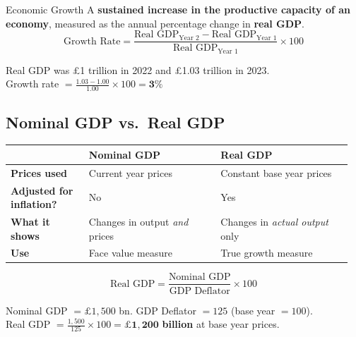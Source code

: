 \documentclass[11pt, a4paper, twoside]{book}
\begin{document}
\begin{keyterm}{Economic Growth}
A \textbf{sustained increase in the productive capacity of an economy}, measured as the annual percentage change in \textbf{real GDP}.
\[
\text{Growth Rate} = \frac{\text{Real GDP}_{\text{Year 2}} - \text{Real GDP}_{\text{Year 1}}}{\text{Real GDP}_{\text{Year 1}}} \times 100
\]
\end{keyterm}

\begin{example}
Real GDP was \pounds1 trillion in 2022 and \pounds1.03 trillion in 2023.\\
Growth rate $= \frac{1.03 - 1.00}{1.00} \times 100 = \mathbf{3\%}$
\end{example}

\subsection{Nominal GDP vs.\ Real GDP}

\begin{tcolorbox}[enhanced,colback=LightBlue,colframe=MidBlue!70,arc=0pt,boxrule=0.8pt]
\begin{tabular}{@{}>{\RaggedRight\arraybackslash}p{0.22\linewidth}>{\RaggedRight\arraybackslash}p{0.37\linewidth}>{\RaggedRight\arraybackslash}p{0.37\linewidth}@{}}
& \textbf{\color{NavyPrimary}Nominal GDP} & \textbf{\color{NavyPrimary}Real GDP} \\
\midrule
\textbf{Prices used} & Current year prices & Constant base year prices \\
\textbf{Adjusted for inflation?} & No & Yes \\
\textbf{What it shows} & Changes in output \emph{and} prices & Changes in \emph{actual output} only \\
\textbf{Use} & Face value measure & True growth measure \\
\end{tabular}
\end{tcolorbox}

\[
\text{Real GDP} = \frac{\text{Nominal GDP}}{\text{GDP Deflator}} \times 100
\]

\begin{example}
Nominal GDP $= \pounds1{,}500$ bn. GDP Deflator $= 125$ (base year $= 100$).\\
Real GDP $= \frac{1{,}500}{125} \times 100 = \pounds\mathbf{1{,}200}$ \textbf{billion} at base year prices.
\end{example}
\end{document}

